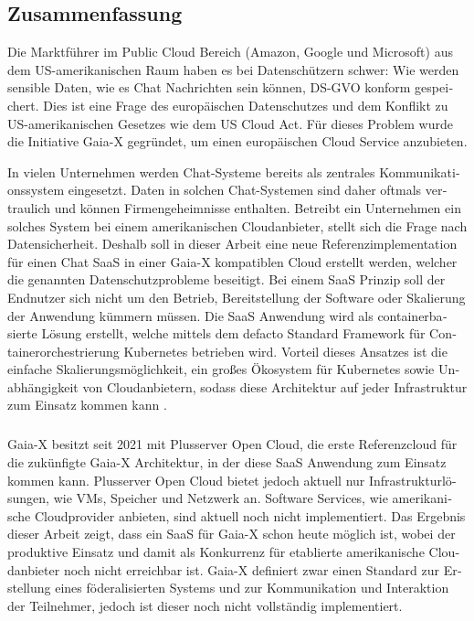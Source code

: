 \begin{otherlanguage}{ngerman}
	\chapter*{Zusammenfassung}

	Die Marktführer im Public Cloud Bereich (Amazon, Google und Microsoft) aus dem US-amerikanischen Raum
	haben es bei Datenschützern schwer:
	Wie werden sensible Daten, wie es Chat Nachrichten sein können, DS-GVO konform gespeichert.
	Dies ist eine Frage des europäischen Datenschutzes und dem Konflikt zu US-amerikanischen Gesetzes wie dem US Cloud Act.
	Für dieses Problem wurde die Initiative Gaia-X gegründet, um einen europäischen Cloud Service anzubieten.

	In vielen Unternehmen werden Chat-Systeme bereits als zentrales Kommunikationssystem eingesetzt.
	Daten in solchen Chat-Systemen sind daher oftmals vertraulich und können Firmengeheimnisse enthalten.
	Betreibt ein Unternehmen ein solches System bei einem amerikanischen Cloudanbieter, stellt sich die Frage nach Datensicherheit.
	Deshalb soll in dieser Arbeit eine neue Referenzimplementation für einen Chat \acf{SaaS} in einer Gaia-X kompatiblen Cloud erstellt werden,
	welcher die genannten Datenschutzprobleme beseitigt.
	Bei einem \ac{SaaS} Prinzip soll der Endnutzer sich nicht um den Betrieb, Bereitstellung der Software
	oder Skalierung der Anwendung kümmern müssen. 
	Die \ac{SaaS} Anwendung wird als containerbasierte Lösung erstellt, welche mittels dem defacto Standard Framework für 
	Containerorchestrierung Kubernetes \cite{Burns2019} betrieben wird. Vorteil dieses Ansatzes ist die einfache Skalierungsmöglichkeit,
	ein großes Ökosystem für Kubernetes sowie Unabhängigkeit von Cloudanbietern, 
	sodass diese Architektur auf jeder Infrastruktur zum Einsatz kommen kann \cite{Burns2019}.
	\paragraph{}
	Gaia-X besitzt seit 2021 mit Plusserver Open Cloud, die erste Referenzcloud für die zukünfigte Gaia-X Architektur,
	in der diese \ac{SaaS} Anwendung zum Einsatz kommen kann.	
	Plusserver Open Cloud bietet jedoch aktuell nur Infrastrukturlösungen, wie \acp{VM}, Speicher und Netzwerk an. 
	Software Services, wie amerikanische Cloudprovider anbieten, sind aktuell noch nicht implementiert.
	Das Ergebnis dieser Arbeit zeigt, dass ein \ac{SaaS} für Gaia-X schon heute möglich ist, 
	wobei der produktive Einsatz und damit als Konkurrenz für etablierte amerikanische Cloudanbieter noch nicht erreichbar ist. 
	Gaia-X definiert zwar einen Standard zur Erstellung eines föderalisierten Systems und zur Kommunikation und Interaktion 
	der Teilnehmer, jedoch ist dieser noch nicht vollständig implementiert. 

\end{otherlanguage}